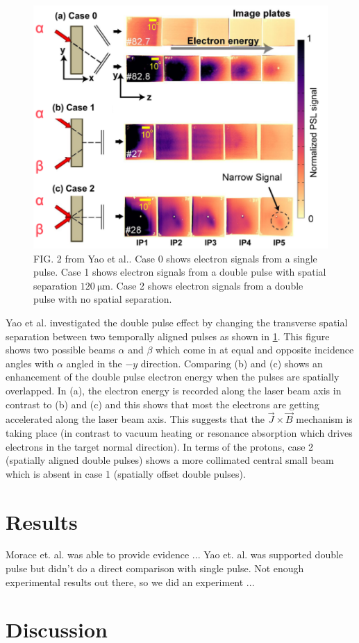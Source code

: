 \begin{figure}
	\centering 
	\includegraphics[width=\linewidth]{planning/images/yao_exp_stacks.PNG}
	\caption{FIG. 2 from Yao et al.\cite{Yao_2024_MaRaE}. Case 0 shows electron signals from a single pulse. Case 1 shows electron signals from a double pulse with spatial separation $\SI{120}{\micro \meter}$. Case 2 shows electron signals from a double pulse with no spatial separation.}
	\label{fig:yao_exp_stacks}
\end{figure}

Yao et al.\cite{Yao_2024_MaRaE} investigated the double pulse effect by changing the transverse spatial separation between two temporally aligned pulses as shown in \cref{fig:yao_exp_stacks}. This figure shows two possible beams $\alpha$ and $\beta$ which come in at equal and opposite incidence angles with $\alpha$ angled in the $-y$ direction. Comparing (b) and (c) shows an enhancement of the double pulse electron energy when the pulses are spatially overlapped. In (a), the electron energy is recorded along the laser beam axis in contrast to (b) and (c) and this shows that most the electrons are getting accelerated along the laser beam axis. This suggests that the $\vec{J} \times \vec{B}$ mechanism is taking place (in contrast to vacuum heating or resonance absorption which drives electrons in the  target normal direction). In terms of the protons, case 2 (spatially aligned double pulses) shows a more collimated central small beam which is absent in case 1 (spatially offset double pulses).

\section{Results}
Morace et. al.\cite{Morace_2019_Nat_Comm} was able to provide evidence ... Yao et. al.\cite{Yao_2024_MaRaE} was supported double pulse but didn't do a direct comparison with single pulse. Not enough experimental results out there, so we did an experiment ...

\section{Discussion}

